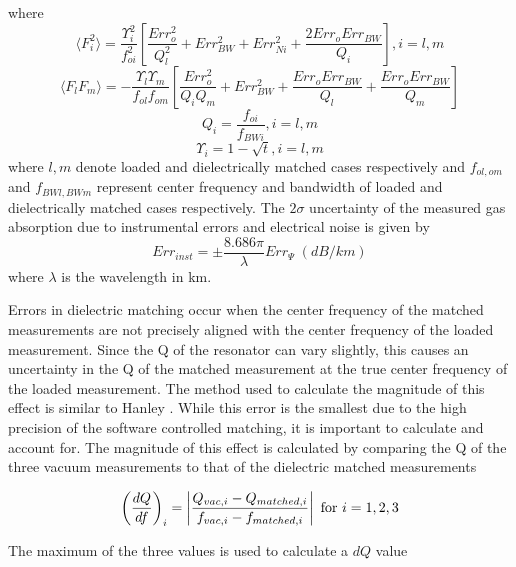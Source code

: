 \noindent where
\begin{equation}
\langle {F_i^2}\rangle = \frac{\Upsilon_i^2}{f_{oi}^2}
\left[ \frac{Err_o^2}{Q_l^2} + Err_{BW}^2 + Err_{Ni}^2 + \frac{2Err_o Err_{BW}}{Q_i} \right], i= l,m
\end{equation}
\begin{equation}
\langle {F_l F_m}\rangle = -\frac{\Upsilon_l \Upsilon_m}{f_{ol} f_{om}}
\left[ \frac{Err_o^2}{Q_i Q_m} + Err_{BW}^2 + \frac{Err_o Err_{BW}}{Q_l} + \frac{Err_o Err_{BW}}{Q_m}\right]
\end{equation}
\begin{equation}
Q_i = \frac{f_{oi}}{f_{BWi}}, i = l,m
\end{equation}
\begin{equation}
\Upsilon_i = 1- \sqrt{t}, i = l,m
\end{equation}
where $l,m$ denote loaded and dielectrically matched cases respectively and $f_{ol,om}$ and $f_{BWl,BWm}$ represent center frequency and bandwidth of loaded and dielectrically matched cases respectively. The $2\sigma$ uncertainty of the measured gas absorption due to instrumental errors and electrical noise is given by
\begin{equation}
Err_{inst} = \pm \frac{8.686\pi}{\lambda}Err_\Psi\;(dB/km)
\end{equation}
where $\lambda$ is the wavelength in km. 

Errors in dielectric matching occur when the center frequency of the matched measurements are not precisely aligned with the center frequency of the loaded measurement. Since the Q of the resonator can vary slightly, this causes an uncertainty in the Q of the matched measurement at the true center frequency of the loaded measurement. The method used to calculate the magnitude of this effect is similar to Hanley \cite{Hanley-thesis}. While this error is the smallest due to the high precision of the software controlled matching, it is important to calculate and account for. The magnitude of this effect is calculated by comparing the Q of the three vacuum measurements to that of the dielectric matched measurements

\begin{equation}
\left(\frac{dQ}{df} \right)_i = \left|\frac{Q_{vac,i} - Q_{matched,i}}{f_{vac,i} - f_{matched,i}} \right| \textnormal{ for } i = 1,2,3
\end{equation}

The maximum of the three values is used to calculate a $dQ$ value

